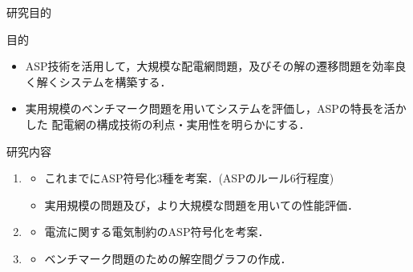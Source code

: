 \documentclass[dvipdfmx,11pt]{beamer}
\begin{document}
\begin{frame}{研究目的}
  \begin{alertblock}{目的}
\begin{itemize}
 \item ASP技術を活用して，大規模な配電網問題，及びその解の遷移問題を効率良く解くシステムを構築する．
 \item 実用規模のベンチマーク問題を用いてシステムを評価し，ASPの特長を活かした
       配電網の構成技術の利点・実用性を明らかにする．
\end{itemize}
  \end{alertblock}
  \vfill
  \begin{block}{研究内容}
    \begin{enumerate}
    \item {}
      \begin{itemize}
	   \item これまでにASP符号化3種を考案．(ASPのルール6行程度)
       \item 実用規模の問題及び，より大規模な問題を用いての性能評価．
      \end{itemize}
	 \item {}
           \begin{itemize}
            \item 電流に関する電気制約のASP符号化を考案．
           \end{itemize}
     \item  {}
           \begin{itemize}
            \item ベンチマーク問題のための解空間グラフの作成．
           \end{itemize}
    \end{enumerate}
  \end{block}
\end{frame}
\end{document}
